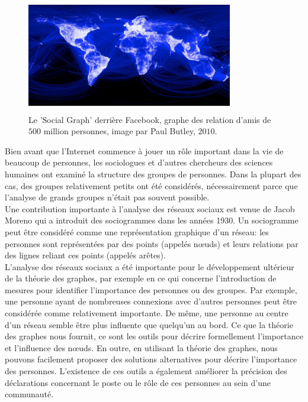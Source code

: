 \begin{figure}[h!]
\centering
\includegraphics[width=9cm,height=5cm]{./figures/facebook}
\caption{Le 'Social Graph' derrière Facebook, graphe des relation d'amis de $500$ million personnes, image par Paul Butley, $2010$.}
\label{Facebook}
\end{figure}
Bien avant que l'Internet commence à jouer un rôle important dans la vie de beaucoup de personnes, les sociologues et d'autres chercheurs des sciences humaines ont examiné la structure des groupes de personnes. Dans la plupart des cas, des groupes relativement petits ont été considérés, nécessairement parce que l'analyse de grands groupes n'était pas souvent possible.\\
Une contribution importante à l'analyse des réseaux sociaux est venue de Jacob Moreno qui a introduit des sociogrammes dans les années 1930. Un sociogramme peut être considéré comme une représentation graphique d'un réseau: les personnes sont représentées par des points (appelés nœuds) et leurs relations par des lignes reliant ces points (appelés arêtes).\\
L'analyse des réseaux sociaux a été importante pour le développement ultérieur de la théorie des graphes, par exemple en ce qui concerne l'introduction de mesures pour identifier l'importance des personnes ou des groupes. Par exemple, une personne ayant de nombreuses connexions avec d'autres personnes peut être considérée comme relativement importante. De même, une personne au centre d'un réseau semble être plus influente que quelqu'un au bord. Ce que la théorie des graphes nous fournit, ce sont les outils pour décrire formellement l'importance et l'influence des nœuds. En outre, en utilisant la théorie des graphes, nous pouvons facilement proposer des solutions alternatives pour décrire l'importance des personnes. L'existence de ces outils a également améliorer la précision des déclarations concernant le poste ou le rôle de ces personnes au sein d'une communauté.
